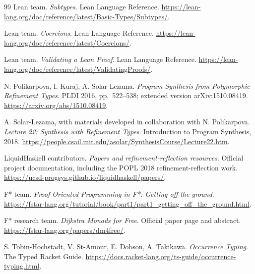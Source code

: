 \documentclass[11pt,letterpaper]{article}
\theoremstyle{definition}\newtheorem{definition}[theorem]{Definition}
\begin{document}
\begin{thebibliography}{99}
Lean team. \emph{Subtypes}. Lean Language Reference.\newline
\url{https://lean-lang.org/doc/reference/latest/Basic-Types/Subtypes/}.

Lean team. \emph{Coercions}. Lean Language Reference.\newline
\url{https://lean-lang.org/doc/reference/latest/Coercions/}.

Lean team. \emph{Validating a Lean Proof}. Lean Language Reference.\newline
\url{https://lean-lang.org/doc/reference/latest/ValidatingProofs/}.

N. Polikarpova, I. Kuraj, A. Solar-Lezama. \emph{Program Synthesis from Polymorphic Refinement Types}. PLDI 2016, pp.\ 522--538; extended version arXiv:1510.08419.\newline
\url{https://arxiv.org/abs/1510.08419}.

A. Solar-Lezama, with materials developed in collaboration with N. Polikarpova. \emph{Lecture 22: Synthesis with Refinement Types}. Introduction to Program Synthesis, 2018.\newline
\url{https://people.csail.mit.edu/asolar/SynthesisCourse/Lecture22.htm}.

LiquidHaskell contributors. \emph{Papers and refinement-reflection resources}. Official project documentation, including the POPL 2018 refinement-reflection work.\newline
\url{https://ucsd-progsys.github.io/liquidhaskell/papers/}.

F* team. \emph{Proof-Oriented Programming in F*: Getting off the ground}.\newline
\url{https://fstar-lang.org/tutorial/book/part1/part1_getting_off_the_ground.html}.

F* research team. \emph{Dijkstra Monads for Free}. Official paper page and abstract.\newline
\url{https://fstar-lang.org/papers/dm4free/}.

S. Tobin-Hochstadt, V. St-Amour, E. Dobson, A. Takikawa. \emph{Occurrence Typing}. The Typed Racket Guide.\newline
\url{https://docs.racket-lang.org/ts-guide/occurrence-typing.html}.
\end{thebibliography}
\end{document}
